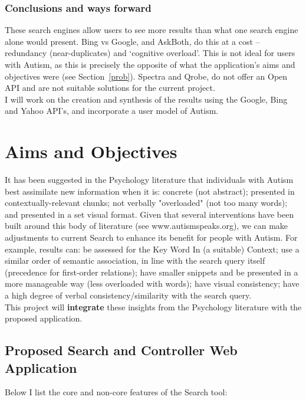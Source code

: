 \documentclass[10pt]{article}
\begin{document}
\subsubsection{Conclusions and ways forward}
These search engines allow users to see more results than what one search engine alone would present. Bing vs Google, and AskBoth, do this at a cost -- redundancy (near-duplicates) and ‘cognitive overload’. This is not ideal for users with Autism, as this is precisely the opposite of what the application's aims and objectives were (see Section~\ref{prob}). Spectra and Qrobe, do not offer an Open API and are not suitable solutions for the current project. \\
I will work on the creation and synthesis of the results using the Google, Bing and Yahoo API's, and incorporate a user model of Autism.

\section{Aims and Objectives} 
It has been suggested in the Psychology literature that individuals with Autism best assimilate new information when it is: concrete (not abstract); presented in contextually-relevant chunks; not verbally "overloaded" (not too many words); and presented in a set visual format. Given that several interventions have been built around this body of literature (see www.autismspeaks.org), we can make adjustments to current Search to enhance its benefit for people with Autism. For example, results can: be assessed for the Key Word In (a suitable) Context; use a similar order of semantic association, in line with the search query itself (precedence for first-order relations); have smaller snippets and be presented in a more manageable way (less overloaded with words); have visual consistency; have a high degree of verbal consistency/similarity with the search query.\\This project will \textbf{integrate} these insights from the Psychology literature with the proposed application.

\subsection{Proposed Search and Controller Web Application}\label{proposed}
Below I list the core and non-core features of the Search tool:
\end{document}
